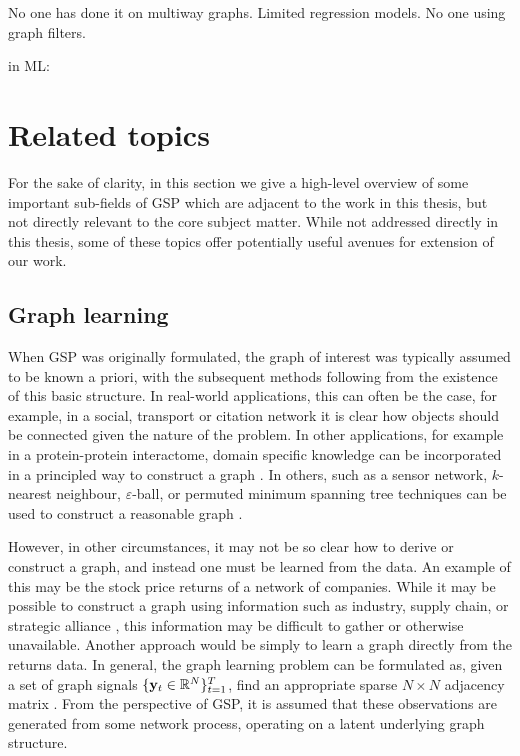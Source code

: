 \cite{Tran2020}

\cite{Sandryhaila2013a}

\citep{Ahmed2017}

No one has done it on multiway graphs. Limited regression models. No one using graph filters. 

in ML: \citep{Belkin2002}




\section{Related topics}

For the sake of clarity, in this section we give a high-level overview of some important sub-fields of GSP which are adjacent to the work in this thesis, but not directly relevant to the core subject matter. While not addressed directly in this thesis, some of these topics offer potentially useful avenues for extension of our work. 


\subsection{Graph learning}

When GSP was originally formulated, the graph of interest was typically assumed to be known a priori, with the subsequent methods following from the existence of this basic structure. In real-world applications, this can often be the case, for example, in a social, transport or citation network it is clear how objects should be connected given the nature of the problem. In other applications, for example in a protein-protein interactome, domain specific knowledge can be incorporated in a principled way to construct a graph \citep{Li2023}. In others, such as a sensor network, $k$-nearest neighbour, $\varepsilon$-ball, or permuted minimum spanning tree techniques can be used to construct a reasonable graph \citep{Qiao2018}. 

However, in other circumstances, it may not be so clear how to derive or construct a graph, and instead one must be learned from the data. An example of this may be the stock price returns of a network of companies. While it may be possible to construct a graph using information such as industry, supply chain, or strategic alliance \citep{Gao2021,Cheng2021}, this information may be difficult to gather or otherwise unavailable. Another approach would be simply to learn a graph directly from the returns data. In general, the graph learning problem can be formulated as, given a set of graph signals $\{\mathbf{y}_t \in \mathbb{R}^N\}_{t=1}^T$, find an appropriate sparse $N \times N$ adjacency matrix \citep{Dong2019}. From the perspective of GSP, it is assumed that these observations are generated from some network process, operating on a latent underlying graph structure. 

